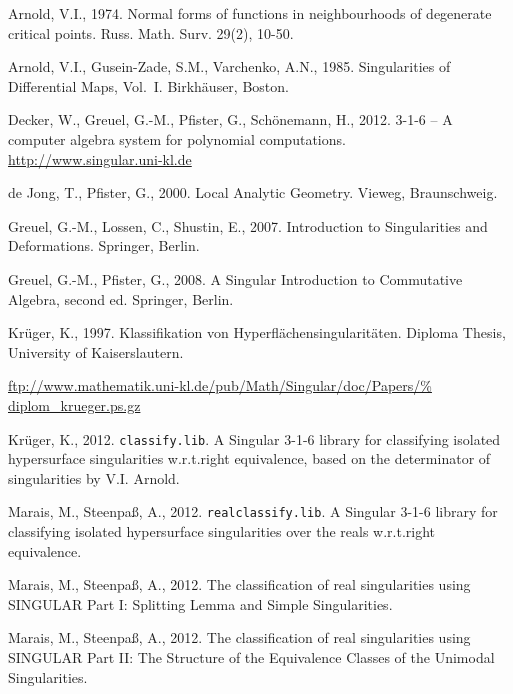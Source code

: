 \documentclass[noend]{amsproc}
\theoremstyle{definition}
\begin{document}
\begin{thebibliography}{99}

Arnold, V.I., 1974.
Normal forms of functions in neighbourhoods of degenerate critical points.
Russ. Math. Surv. 29(2), 10-50.

Arnold, V.I., Gusein-Zade, S.M., Varchenko, A.N., 1985.
Singularities of Differential Maps, Vol.~I.
Birkh\"auser, Boston.

Decker, W., Greuel, G.-M., Pfister, G., Sch{\"o}nemann, H., 2012.
 {3-1-6} -- {A} computer algebra system for polynomial
computations. \\
\url{http://www.singular.uni-kl.de}

de Jong, T., Pfister, G., 2000.
Local Analytic Geometry.
Vieweg, Braunschweig.

Greuel, G.-M., Lossen, C., Shustin, E., 2007.
Introduction to Singularities and Deformations.
Springer, Berlin.

Greuel, G.-M., Pfister, G., 2008.
A Singular Introduction to Commutative Algebra, second ed.
Springer, Berlin.

Kr\"uger, K., 1997.
Klassifikation von Hyperfl\"achensingularit\"aten.
Diploma Thesis, University of Kaiserslautern.
{\par\raggedright
\url{ftp://www.mathematik.uni-kl.de/pub/Math/Singular/doc/Papers/%
diplom_krueger.ps.gz}
\par}

Kr\"uger, K., 2012.
{\tt classify.lib}. {A} {\sc Singular} {3-1-6} library for classifying isolated
hypersurface singularities w.r.t.\@ right equivalence, based on the
determinator of singularities by V.I. Arnold.

Marais, M., Steenpa\ss, A., 2012.
{\tt realclassify.lib}. {A} {\sc Singular} {3-1-6} library for classifying
isolated hypersurface singularities over the reals w.r.t.\@ right equivalence.

Marais, M., Steenpa\ss, A., 2012. The classification of real singularities using \textsc{SINGULAR} Part I: Splitting Lemma and Simple Singularities.

Marais, M., Steenpa\ss, A., 2012. The classification of real singularities using \textsc{SINGULAR} Part II: The Structure of the Equivalence Classes of the Unimodal Singularities.


\end{thebibliography}
\end{document}
